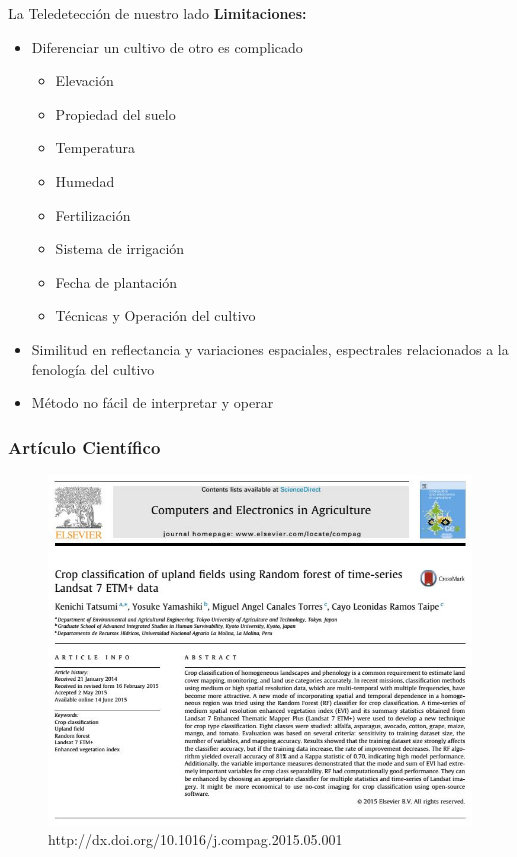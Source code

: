 
\begin{frame}{La Teledetección de nuestro lado}
	\textbf{Limitaciones:}
	\begin{itemize}
		\item <1-> Diferenciar un cultivo de otro es complicado
		\begin{itemize}
			\item Elevación
			\item Propiedad del suelo
			\item Temperatura
			\item Humedad
			\item Fertilización
			\item Sistema de irrigación
			\item Fecha de plantación
			\item Técnicas y Operación del cultivo
		\end{itemize}
		\item <2-> Similitud en reflectancia y variaciones espaciales, espectrales relacionados a la fenología del cultivo
		\item <3-> Método no fácil de interpretar y operar 
	\end{itemize}
\end{frame}


\begin{frame}
	\frametitle{Artículo Científico}
	
	\begin{figure}
		\includegraphics[scale=0.4]{imgs/paper.JPG}\\
		\footnotesize{http://dx.doi.org/10.1016/j.compag.2015.05.001}
		\centering
	\end{figure}
\end{frame}